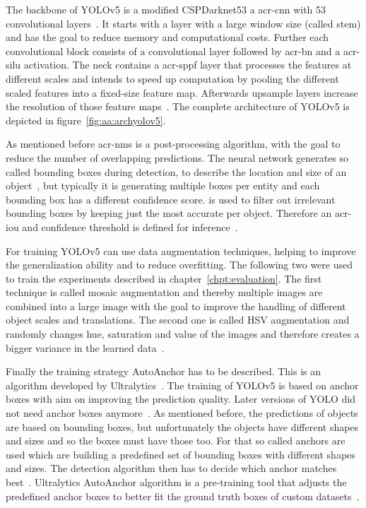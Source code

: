 The backbone of YOLOv5 is a modified CSPDarknet53 a \gls{acr-cnn} with 53 convolutional 
layers~\cite{terven2023, redmon2018, wang2020}. It starts with a  layer with a large window size 
(called stem) and has the goal to reduce memory and computational costs. Further each 
convolutional block consists of a convolutional layer followed by \gls{acr-bn} and a \gls{acr-silu} 
activation. The neck contains a \gls{acr-sppf} layer that processes the features at different scales 
and intends to speed up computation by pooling the different scaled features into a fixed-size 
feature map. Afterwards upsample layers increase the resolution of those feature 
maps~\cite{terven2023}. The complete architecture of YOLOv5 is depicted in 
figure~\ref{fig:aa:archyolov5}.

As mentioned before \gls{acr-nms} is a post-processing algorithm, with the goal to reduce the 
number of overlapping predictions. The neural network generates so called bounding boxes during 
detection, to describe the location and size of an object~\cite{anchor2023}, but typically it is 
generating multiple boxes per entity and each bounding box has a different confidence score. 
 is used to filter out irrelevant bounding boxes by keeping just the most accurate per 
object. Therefore an \gls{acr-iou} and confidence threshold is defined for 
inference~\cite{terven2023}.

For training YOLOv5 can use data augmentation techniques, helping to improve the generalization 
ability and to reduce overfitting. The following two were used to train the experiments described in 
chapter~\ref{chpt:evaluation}. The first technique is called mosaic augmentation and thereby 
multiple images are combined into a large image with the goal to improve the handling of different 
object scales and translations. The second one is called HSV augmentation and randomly changes 
hue, saturation and value of the images and therefore creates a bigger variance in the learned 
data~\cite{archYolov5}.

Finally the training strategy AutoAnchor has to be described. This is an algorithm developed by 
Ultralytics~\cite{terven2023, archYolov5}. The training of YOLOv5 is based on anchor boxes with 
aim on improving the prediction quality. Later versions of YOLO did not need anchor boxes 
anymore~\cite{terven2023, zheng2022}. As mentioned before, the predictions of objects are based 
on bounding boxes, but unfortunately the objects have different shapes and sizes and so the boxes 
must have those too. For that so called anchors are used which are building a predefined set of 
bounding boxes with different shapes and sizes. The detection algorithm then has to decide which 
anchor matches best~\cite{anchor2023}. Ultralytics AutoAnchor algorithm is a pre-training tool that 
adjusts the predefined anchor boxes to better fit the ground truth boxes of custom 
datasets~\cite{terven2023, archYolov5}.

